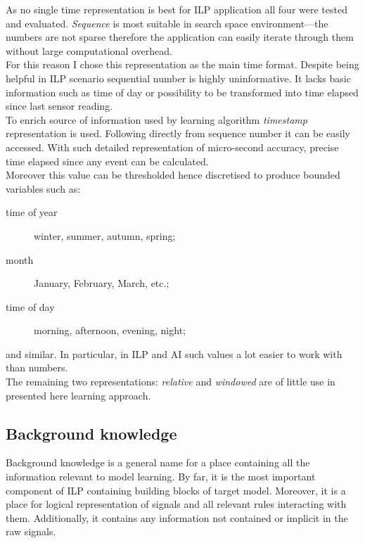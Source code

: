 \documentclass[12pt, a4paper, pdflatex, leqno, twoside, openright]{report}
\begin{document}
As no single time representation is best for ILP application all four were tested and evaluated. \emph{Sequence} is most suitable in search space environment---the numbers are not sparse therefore the application can easily iterate through them without large computational overhead.\\
For this reason I chose this representation as the main time format. Despite being helpful in ILP scenario sequential number is highly uninformative. It lacks basic information such as time of day or possibility to be transformed into time elapsed since last sensor reading.\\

To enrich source of information used by learning algorithm \emph{timestamp} representation is used. Following directly from sequence number it can be easily accessed. With such detailed representation of micro-second accuracy, precise time elapsed since any event can be calculated.\\
Moreover this value can be thresholded hence discretised to produce bounded variables such as:
\begin{description}
\item[time of year] winter, summer, autumn, spring;
\item[month] January, February, March, etc.;
\item[time of day] morning, afternoon, evening, night;
\end{description}
and similar. In particular, in ILP and AI such values a lot easier to work with than numbers.\\

The remaining two representations: \emph{relative} and \emph{windowed} are of little use in presented here learning approach.

    \subsection{Background knowledge\label{sec:data:bkg}}
Background knowledge is a general name for a place containing all the information relevant to model learning. By far, it is the most important component of ILP containing building blocks of target model. Moreover, it is a place for logical representation of signals and all relevant rules interacting with them. Additionally, it contains any information not contained or implicit in the raw signals.\\
\end{document}
